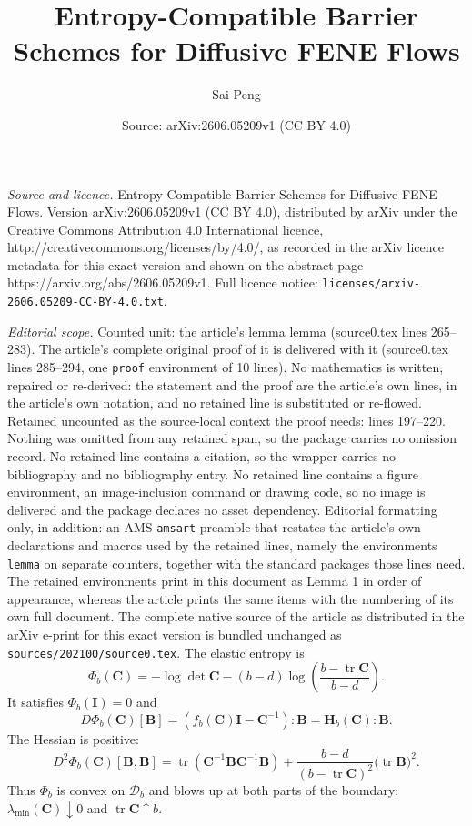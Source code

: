 \documentclass[10pt,a4paper]{amsart}
\title{Entropy-Compatible Barrier Schemes for Diffusive FENE Flows}
\author{Sai Peng}
\date{Source: arXiv:2606.05209v1 (CC BY 4.0)}
\newcommand{\BB}{\bm B}
\newcommand{\CC}{\bm C}
\newcommand{\HH}{\bm H}
\newcommand{\Id}{\bm I}
\newcommand{\calD}{\mathcal D}
\newcommand{\tr}{\operatorname{tr}}
\begin{document}
\maketitle

\noindent\emph{Source and licence.} Entropy-Compatible Barrier Schemes for Diffusive FENE Flows. Version arXiv:2606.05209v1 (CC BY 4.0), distributed by arXiv under the Creative Commons Attribution 4.0 International licence, http://creativecommons.org/licenses/by/4.0/, as recorded in the arXiv licence metadata for this exact version and shown on the abstract page https://arxiv.org/abs/2606.05209v1. Full licence notice: \texttt{licenses/arxiv-2606.05209-CC-BY-4.0.txt}.\par\smallskip

\noindent\textit{Editorial scope.} Counted unit: the article's lemma lemma (source0.tex lines 265--283). The article's complete original proof of it is delivered with it (source0.tex lines 285--294, one \texttt{proof} environment of 10 lines). No mathematics is written, repaired or re-derived: the statement and the proof are the article's own lines, in the article's own notation, and no retained line is substituted or re-flowed.  Retained uncounted as the source-local context the proof needs: lines 197--220.  Nothing was omitted from any retained span, so the package carries no omission record.  No retained line contains a citation, so the wrapper carries no bibliography and no bibliography entry.  No retained line contains a figure environment, an image-inclusion command or drawing code, so no image is delivered and the package declares no asset dependency.  Editorial formatting only, in addition: an AMS \texttt{amsart} preamble that restates the article's own declarations and macros used by the retained lines, namely the environments \texttt{lemma} on separate counters, together with the standard packages those lines need.  The retained environments print in this document as Lemma 1 in order of appearance, whereas the article prints the same items with the numbering of its own full document.  The complete native source of the article as distributed in the arXiv e-print for this exact version is bundled unchanged as \texttt{sources/202100/source0.tex}.
The elastic entropy is
\[
  \Phi_b(\CC)
  =
  -\log\det\CC-(b-d)\log\left(\frac{b-\tr\CC}{b-d}\right).
  \label{eq:fene-entropy}
\]
It satisfies $\Phi_b(\Id)=0$ and
\[
  D\Phi_b(\CC)[\BB]
  =
  \left(f_b(\CC)\Id-\CC^{-1}\right):\BB
  =\HH_b(\CC):\BB .
\]
The Hessian is positive:
\[
  D^2\Phi_b(\CC)[\BB,\BB]
  =
  \tr(\CC^{-1}\BB\CC^{-1}\BB)
  +
  \frac{b-d}{(b-\tr\CC)^2}\bigl(\tr\BB\bigr)^2 .
  \label{eq:hessian}
\]
Thus $\Phi_b$ is convex on $\calD_b$ and blows up at both parts of the boundary: $\lambda_{\min}(\CC)\downarrow0$ and $\tr\CC\uparrow b$.
\end{document}
